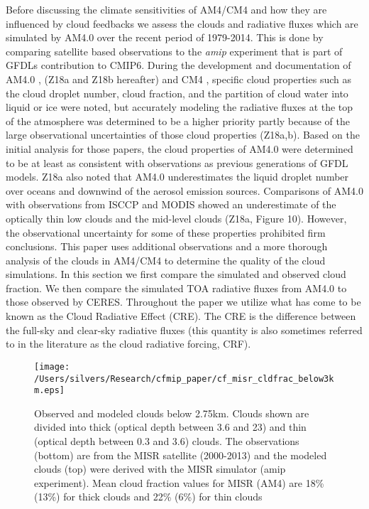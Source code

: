 \documentclass[draft]{agujournal2019}
\begin{document}
Before discussing the climate sensitivities of AM4/CM4 and how they are influenced by cloud feedbacks we assess
the clouds and radiative fluxes which are simulated by AM4.0 over the recent period of 1979-2014.  This is done 
by comparing satellite based observations to the \textit{amip} experiment that is part of GFDLs 
contribution to CMIP6.  
During the development and documentation of AM4.0 \cite{Zhao_etal_2018a, Zhao_etal_2018b}, 
(Z18a and Z18b hereafter) 
and CM4 \cite{Held_etal_2019}, specific cloud properties such as the 
cloud droplet number, cloud fraction, and the partition of cloud water into liquid or ice were noted, but 
accurately modeling the radiative fluxes at the top of the atmosphere was determined to be a 
higher priority partly because of the large observational uncertainties of those cloud properties (Z18a,b).   
Based on the initial analysis for those papers, the cloud properties of AM4.0 were determined to be
at least as consistent with observations as previous generations of GFDL models.  Z18a also noted 
that AM4.0 underestimates the liquid droplet number over oceans and downwind of the aerosol emission 
sources.   
Comparisons of AM4.0 with observations from ISCCP and MODIS showed an underestimate of 
the optically thin low clouds and the mid-level clouds (Z18a, Figure 10).  
However, the observational uncertainty for some of these properties prohibited firm conclusions.  This paper
uses additional observations and a more thorough analysis of the clouds in AM4/CM4 to determine 
the quality of the cloud simulations.        
In this section we first compare the simulated and observed cloud fraction.  We then compare  
the simulated TOA radiative fluxes from AM4.0 to those observed by CERES.    
Throughout the paper we utilize what has come to be known as the Cloud Radiative Effect (CRE).  The CRE is the 
difference between the full-sky and clear-sky radiative fluxes (this quantity is also sometimes referred
to in the literature as the cloud radiative forcing, CRF). 

\begin{figure}
  \centering
  \texttt{[image: /Users/silvers/Research/cfmip\_paper/cf\_misr\_cldfrac\_below3km.eps]}
  \caption{Observed and modeled clouds below 2.75km.  Clouds shown are divided into thick 
  (optical depth between 3.6 and 23) and thin (optical depth between 0.3 and 3.6) 
  clouds.  The observations (bottom) are from the MISR satellite (2000-2013) and the modeled clouds (top) were derived 
  with the MISR simulator (amip experiment). Mean cloud fraction values for MISR 
  (AM4) are 18\% (13\%) for thick clouds and 22\% (6\%) for thin clouds}
  \label{fig:cf_misr_lowcl}
\end{figure}
\end{document}

